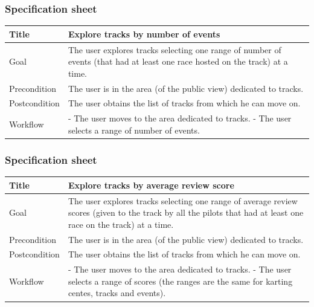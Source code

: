 \documentclass{beamer}
\begin{document}
\begin{frame}
    \frametitle{Specification sheet}
    \begin{table}
        \tiny
        \begin{tabular}{|p{2cm}|p{6cm}|}
        \hline
        Title & \textbf{Explore tracks by number of events} \\
        \hline
        Goal & The user explores tracks selecting one range of number of events
        (that had at least one race hosted on the track) at a time. \\
        \hline
        Precondition & The user is in the area (of the public view) dedicated to tracks.\\
        \hline
        Postcondition & The user obtains the list of tracks from which he can move on.\\
        \hline
        Workflow &
        - The user moves to the area dedicated to tracks. \newline
        - The user selects a range of number of events. \\
        \hline
        \end{tabular}
\end{table}
\end{frame}

\begin{frame}
    \frametitle{Specification sheet}
    \begin{table}
        \tiny
        \begin{tabular}{|p{2cm}|p{6cm}|}
        \hline
        Title & \textbf{Explore tracks by average review score} \\
        \hline
        Goal & The user explores tracks selecting one range of average review scores (given to the track by all the pilots
        that had at least one race on the track) at a time. \\
        \hline
        Precondition & The user is in the area (of the public view) dedicated to tracks.\\
        \hline
        Postcondition & The user obtains the list of tracks from which he can move on.\\
        \hline
        Workflow &
        - The user moves to the area dedicated to tracks. \newline
        - The user selects a range of scores (the ranges are the same for karting centes, tracks and events). \\
        \hline
        \end{tabular}
\end{table}
\end{frame}
\end{document}
